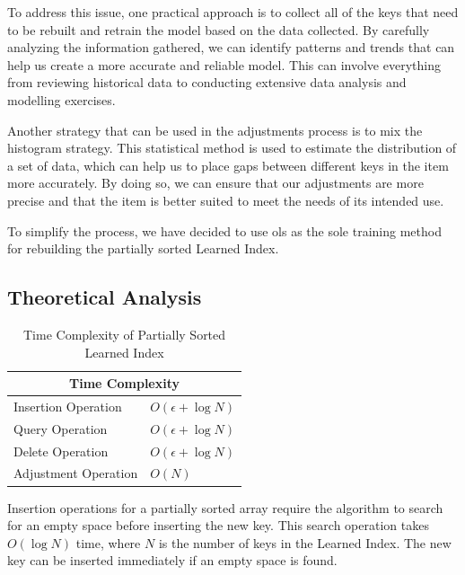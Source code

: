 \documentclass[11pt,a4paper]{article}
\newcommand{\learnindex}{\textsf{Learned Index}\xspace}
\begin{document}
To address this issue, one practical approach is to collect all of the keys that need to be rebuilt and retrain the model based on the data collected. By carefully analyzing the information gathered, we can identify patterns and trends that can help us create a more accurate and reliable model. This can involve everything from reviewing historical data to conducting extensive data analysis and modelling exercises.

Another strategy that can be used in the adjustments process is to mix the histogram strategy. This statistical method is used to estimate the distribution of a set of data, which can help us to place gaps between different keys in the item more accurately. By doing so, we can ensure that our adjustments are more precise and that the item is better suited to meet the needs of its intended use.

To simplify the process, we have decided to use \acrfull{ols} as the sole training method for rebuilding the partially sorted \learnindex.

\subsection{Theoretical Analysis}\label{partialsortedtheory}
\begin{table}
    \centering
    \begin{tabular}{ |p{4cm}|p{2cm}|  } 
        
     \hline
     \multicolumn{2}{|c|}{Time Complexity} \\
     \hline
      Insertion Operation & $O(\epsilon + \log N)$ \\
     \hline
      Query Operation &  $O(\epsilon + \log N)$ \\
      \hline
      Delete Operation &  $O(\epsilon + \log N)$ \\
      \hline
      Adjustment Operation & $O(N)$ \\
      \hline
    \end{tabular}
     \caption{Time Complexity of Partially Sorted \learnindex}
    \label{tab:timecomplexitypartiallysorted}
\end{table}

Insertion operations for a partially sorted array require the algorithm to search for an empty space before inserting the new key. This search operation takes $O(\log N)$ time, where $N$ is the number of keys in the \learnindex. The new key can be inserted immediately if an empty space is found.
\end{document}
